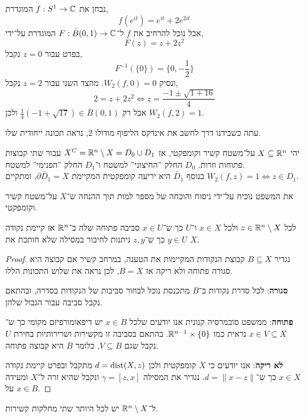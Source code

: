 \begin{example}
	נבחן את $f : S^1 \to \mathbb{C}$ המוגדרת,
	\[
		f(e^{i t}) = e^{i t} + 2 e^{2i t}
	\]
	אבל נוכל להרחיב את $f$ ל־$F : \bar{B}(0, 1) \to \mathbb{C}$ המוגדרת על־ידי,
	\[
		F(z) = z + 2 z^2
	\]
	בפרט עבור $z = 0$ נקבל,
	\[
		F^{-1}(\{ 0 \})
		= \{ 0, -\frac{1}{2} \}
	\]
	ונסיק $W_2(f, 0) = 0$.
	מהצד השני עבור $z = 2$ נקבל,
	\[
		2 = z + 2 z^2
		\iff z = \frac{-1 \pm \sqrt{1 + 16}}{4}
	\]
	אבל רק $\frac{1}{4}(-1 + \sqrt{17}) \in \bar{B}(0, 1)$ ולכן $W_2(f, 2) = 1$.
\end{example}
עתה כשבידנו דרך לחשב את אינדקס הליפוף מודולו 2, נראה תכונה ייחודית שלו.
\begin{theorem}
	יהי $X \subseteq \mathbb{R}^n$ על־משטח קשיר וקומפקטי,
	אז $X^C = \mathbb{R}^n \setminus X = D_0 \cup D_1$ עבור שתי קבוצות פתוחות וזרות.
	$D_0$ החלק ''החיצוני'' למשטח ו־$D_1$ החלק ''הפנימי'' למשטח. \\
	בנוסף $\bar{D}_1$ היא יריעה קומפקטית המקיימת $\partial \bar{D}_1 = X$, ומתקיים $W_2(f, z) = 1 \iff z \in D_1$.
\end{theorem}
את המשפט נוכיח על־ידי ניסוח והוכחה של מספר למות תוך ההנחה ש־$X$ על־משטח קשיר וקומפקטי.
\begin{lemma}
	לכל $z \in \mathbb{R}^n \setminus X$ ולכל $x \in X$ ו־$U$ כך ש־$x \in U$ סביבה פתוחה שלה ב־$\mathbb{R}^n$ אז קיימת נקודה $y \in U$ כך ש־$z, y$ ניתנות לחיבור במסילה שלא חותכת את $X$.
\end{lemma}
\begin{proof}
	נגדיר $B \subseteq X$ קבוצת הנקודות המקיימות את הטענה, במרחב קשיר אם קבוצה היא סגורה פתוחה ולא ריקה אז $B = X$, לכן נראה את שלוש התכונות הללו.

	\textbf{סגורה}:
	לכל סדרת נקודות ב־$B$ מתכנסת נוכל לבחור סביבות של הנקודות בסדרה, ובהתאם נקבל סביבה עבור הגבול שלהן.

	\textbf{פתוחה}:
	ממשפט סובמרסיה קנונית אנו יודעים שלכל $x \in B$ יש דיפאומורפיזם מקומי כך ש־$x \in V \subseteq X$ נראית כמו $\mathbb{R}^{n - 1} \times \{ 0 \}$.
	בהתאם בסביבה זו מקשירות ושרירותיות בחירת $U$ נקבל שגם $V \subseteq B$, כלומר $B$ היא קבוצה פתוחה.

	\textbf{לא ריקה}:
	אנו יודעים כי $X$ קומפקטית ולכן $d = \operatorname{dist}(X, z)$ מתקבל ובפרט קיימת נקודה $x \in X$ כך ש־$d = \lVert x - z \rVert$.
	נגדיר את המסילה $\gamma = [z, x]$ ונקבל שהיא זרה ל־$X$ ומעידה על $x \in B$.
\end{proof}
\begin{lemma}\label{at_most_two_connected_components_lemma}
	ל־$\mathbb{R}^n \setminus X$ יש לכל היותר שתי מחלקות קשירות.
\end{lemma}
